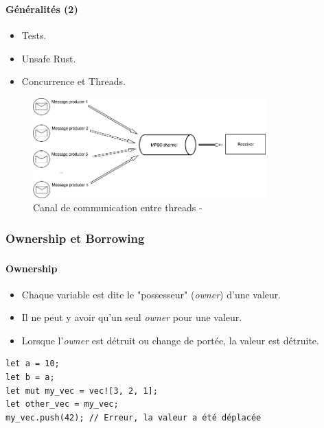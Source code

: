 \documentclass[10pt]{beamer}
\begin{document}
\begin{frame}
    \frametitle{\subsecname}
    \framesubtitle{Généralités (2)}
    \begin{itemize}
        \item Tests.
        \pause
        \item Unsafe Rust.
        \pause
        \item Concurrence et Threads.
    \end{itemize}
    \begin{figure}
        \begin{center}
            \includegraphics[width=0.8\textwidth]{images/mpsc.png}
            \caption{Canal de communication entre threads - \cite{ref37}}
        \end{center}
    \end{figure}
\end{frame}

\subsubsection{Ownership et Borrowing}
\begin{frame}[fragile]
    \frametitle{\subsecname}
    \framesubtitle{Ownership}
    \begin{itemize}
        \pause
        \item Chaque variable est dite le "possesseur" (\textit{owner}) d'une valeur.
        \pause
        \item Il ne peut y avoir qu'un seul \textit{owner} pour une valeur.
        \pause
        \item Lorsque l'\textit{owner} est détruit ou change de portée, la valeur est détruite.
    \end{itemize}
    \bigbreak
    \pause
    \begin{verbatim}
let a = 10;
let b = a;
let mut my_vec = vec![3, 2, 1]; 
let other_vec = my_vec;
my_vec.push(42); // Erreur, la valeur a été déplacée
    \end{verbatim}
\end{frame}
\end{document}

